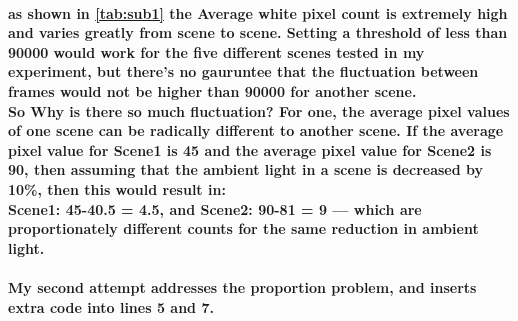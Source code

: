 \documentclass[11pt]{article} %
\begin{document}
\paragraph{as shown in \cref{tab:sub1} the Average white pixel count is extremely high and varies greatly from scene to scene. Setting a threshold of less than 90000 would work for the five different scenes tested in my experiment, but there’s no gauruntee that the fluctuation between frames would not be higher than 90000 for another scene. \\
So Why is there so much fluctuation? For one, the average pixel values of one scene can be radically different to another scene. If the average pixel value for Scene1 is 45 and the average pixel value for Scene2 is 90, then assuming that the ambient light in a scene is decreased by 10\%, then this would result in:\\
Scene1:  45-40.5 = 4.5, and Scene2: 90-81 = 9 --- which are proportionately different counts for the same reduction in ambient light.\\
 }
\paragraph{My second attempt addresses the proportion problem, and inserts extra code into lines 5 and 7.}

\end{document}
